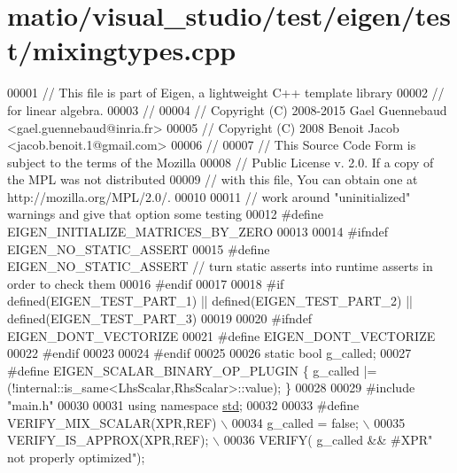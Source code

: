 \hypertarget{matio_2visual__studio_2test_2eigen_2test_2mixingtypes_8cpp_source}{}\section{matio/visual\+\_\+studio/test/eigen/test/mixingtypes.cpp}
\label{matio_2visual__studio_2test_2eigen_2test_2mixingtypes_8cpp_source}

\begin{DoxyCode}
00001 \textcolor{comment}{// This file is part of Eigen, a lightweight C++ template library}
00002 \textcolor{comment}{// for linear algebra.}
00003 \textcolor{comment}{//}
00004 \textcolor{comment}{// Copyright (C) 2008-2015 Gael Guennebaud <gael.guennebaud@inria.fr>}
00005 \textcolor{comment}{// Copyright (C) 2008 Benoit Jacob <jacob.benoit.1@gmail.com>}
00006 \textcolor{comment}{//}
00007 \textcolor{comment}{// This Source Code Form is subject to the terms of the Mozilla}
00008 \textcolor{comment}{// Public License v. 2.0. If a copy of the MPL was not distributed}
00009 \textcolor{comment}{// with this file, You can obtain one at http://mozilla.org/MPL/2.0/.}
00010 
00011 \textcolor{comment}{// work around "uninitialized" warnings and give that option some testing}
00012 \textcolor{preprocessor}{#define EIGEN\_INITIALIZE\_MATRICES\_BY\_ZERO}
00013 
00014 \textcolor{preprocessor}{#ifndef EIGEN\_NO\_STATIC\_ASSERT}
00015 \textcolor{preprocessor}{#define EIGEN\_NO\_STATIC\_ASSERT // turn static asserts into runtime asserts in order to check them}
00016 \textcolor{preprocessor}{#endif}
00017 
00018 \textcolor{preprocessor}{#if defined(EIGEN\_TEST\_PART\_1) || defined(EIGEN\_TEST\_PART\_2) || defined(EIGEN\_TEST\_PART\_3)}
00019 
00020 \textcolor{preprocessor}{#ifndef EIGEN\_DONT\_VECTORIZE}
00021 \textcolor{preprocessor}{#define EIGEN\_DONT\_VECTORIZE}
00022 \textcolor{preprocessor}{#endif}
00023 
00024 \textcolor{preprocessor}{#endif}
00025 
00026 \textcolor{keyword}{static} \textcolor{keywordtype}{bool} g\_called;
00027 \textcolor{preprocessor}{#define EIGEN\_SCALAR\_BINARY\_OP\_PLUGIN \{ g\_called |= (!internal::is\_same<LhsScalar,RhsScalar>::value); \}}
00028 
00029 \textcolor{preprocessor}{#include "main.h"}
00030 
00031 \textcolor{keyword}{using namespace }\hyperlink{namespacestd}{std};
00032 
00033 \textcolor{preprocessor}{#define VERIFY\_MIX\_SCALAR(XPR,REF) \(\backslash\)}
00034 \textcolor{preprocessor}{  g\_called = false; \(\backslash\)}
00035 \textcolor{preprocessor}{  VERIFY\_IS\_APPROX(XPR,REF); \(\backslash\)}
00036 \textcolor{preprocessor}{  VERIFY( g\_called && #XPR" not properly optimized");}

\end{DoxyCode}
